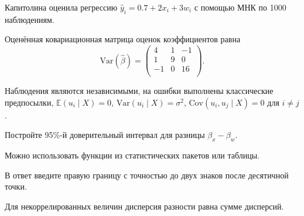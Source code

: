 
\begin{question}
Капитолина оценила регрессию \(\hat y_i = 0.7 + 2x_i + 3w_i\) с помощью МНК по 1000 наблюдениям.

Оценённая ковариационная матрица оценок коэффициентов равна
\[
\mathrm{Var}(\hat\beta) = 
\begin{pmatrix}
4 & 1 & -1 \\
1 & 9 & 0 \\
-1 & 0 & 16 \\
\end{pmatrix}.
\]

Наблюдения являются независимыми, на ошибки выполнены классические предпосылки, \(\mathbb E(u_i \mid X) = 0\), \(\mathrm{Var}(u_i \mid X) = \sigma^2\),
\(\mathrm{Cov}(u_i, u_j \mid X) = 0\) для \(i\neq j\).

Постройте 95\%-й доверительный интервал для разницы \(\beta_x - \beta_w\).

Можно использовать функции из статистических пакетов или таблицы.

В ответ введите правую границу с точностью до двух знаков после десятичной точки.
\end{question}

\begin{solution}
Для некоррелированных величин дисперсия разности равна сумме дисперсий.
\end{solution}

